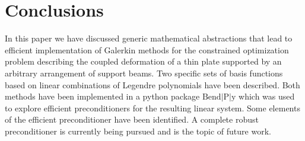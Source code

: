 \documentclass{marine_2015}
\begin{document}
\section{Conclusions}
\label{sec:end}
In this paper we have discussed generic mathematical abstractions that lead to efficient
implementation of Galerkin methods for the constrained optimization problem
describing the coupled deformation of a thin plate supported by an arbitrary arrangement 
of support beams. Two specific sets of basis functions based on linear combinations of 
Legendre polynomials have been described. Both methods have been implemented in a python package 
$\text{Bend}\!\left|\text{P}\right|\!\text{y}$ which was used to explore efficient 
preconditioners for the resulting linear system. Some elements of the efficient
preconditioner have been identified. A complete robust preconditioner is currently
being pursued and is the topic of future work.
\end{document}

